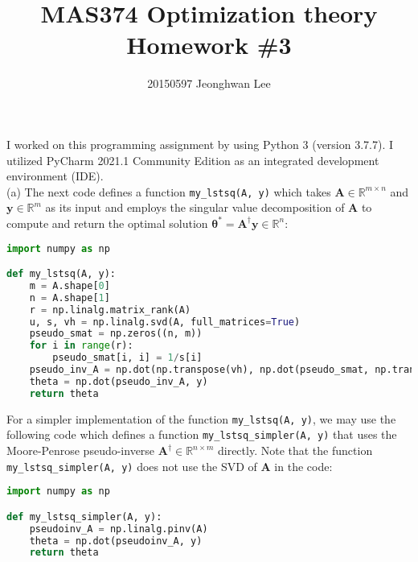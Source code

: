 \documentclass[11pt]{article}
\begin{document}
 
\title{MAS374 Optimization theory\\ Homework \#3}
\author{20150597 Jeonghwan Lee}

\maketitle

I worked on this programming assignment by using Python 3 (version 3.7.7). I utilized PyCharm 2021.1 Community Edition as an integrated development environment (IDE). \\ [10pt]
\indent (a) The next code defines a function \texttt{my\_lstsq(A, y)} which takes $\mathbf{A} \in \mathbb{R}^{m \times n}$ and $\mathbf{y} \in \mathbb{R}^m$ as its input and employs the singular value decomposition of $\mathbf{A}$ to compute and return the optimal solution $\bm{\theta}^* = \mathbf{A}^{\dagger} \mathbf{y} \in \mathbb{R}^n$:

\begin{lstlisting}[language = Python]
import numpy as np

def my_lstsq(A, y):
    m = A.shape[0]
    n = A.shape[1]
    r = np.linalg.matrix_rank(A)
    u, s, vh = np.linalg.svd(A, full_matrices=True)
    pseudo_smat = np.zeros((n, m))
    for i in range(r):
        pseudo_smat[i, i] = 1/s[i]
    pseudo_inv_A = np.dot(np.transpose(vh), np.dot(pseudo_smat, np.transpose(u)))
    theta = np.dot(pseudo_inv_A, y)
    return theta
\end{lstlisting}

\noindent For a simpler implementation of the function \texttt{my\_lstsq(A, y)}, we may use the following code which defines a function \texttt{my\_lstsq\_simpler(A, y)} that uses the Moore-Penrose pseudo-inverse $\mathbf{A}^{\dagger} \in \mathbb{R}^{n \times m}$ directly. Note that the function \texttt{my\_lstsq\_simpler(A, y)} does not use the \textsf{SVD} of $\mathbf{A}$ in the code:

\begin{lstlisting}[language = Python]
import numpy as np

def my_lstsq_simpler(A, y):
    pseudoinv_A = np.linalg.pinv(A)
    theta = np.dot(pseudoinv_A, y)
    return theta
\end{lstlisting}
\end{document}
